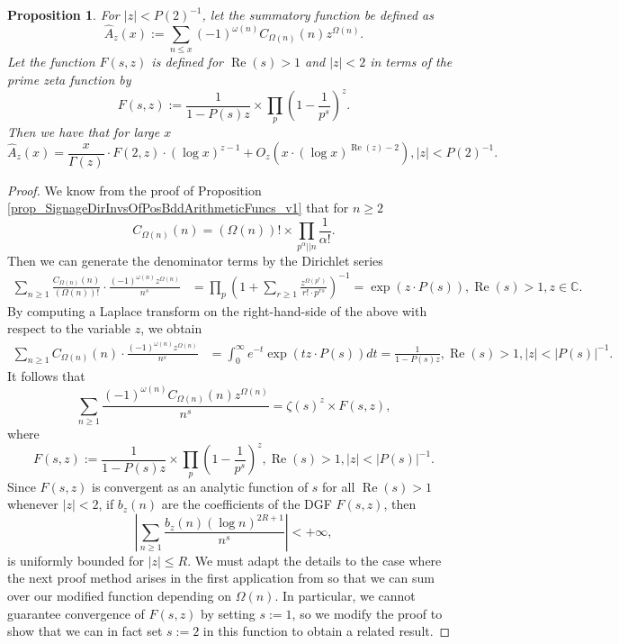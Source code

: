 \documentclass[11pt,reqno,a4letter]{article}
\numberwithin{figure}{section}
\numberwithin{table}{section}
\theoremstyle{plain}
\newtheorem{prop}[theorem]{Proposition}
\numberwithin{theorem}{section}
\theoremstyle{definition}
\renewcommand{\Re}{\operatorname{Re}}
\begin{document}
\begin{prop} 
\label{prop_HatAzx_ModSummatoryFuncExps_RelatedToCkn} 
For $|z| < P(2)^{-1}$, let the summatory function be defined as 
\[
\widehat{A}_z(x) := \sum_{n \leq x} (-1)^{\omega(n)} 
     C_{\Omega(n)}(n) z^{\Omega(n)}. 
\]
Let the function $F(s, z)$ is defined for $\Re(s) > 1$ and $|z| < 2$ 
in terms of the prime zeta function by 
\[
F(s, z) := \frac{1}{1-P(s) z} 
     \times \prod_p \left(1 - \frac{1}{p^s}\right)^{z}. 
\]
Then we have that for large $x$ 
\[
\widehat{A}_z(x) = \frac{x}{\Gamma(z)} \cdot F(2, z) \cdot (\log x)^{z-1} + 
     O_{z}\left(x \cdot (\log x)^{\Re(z) - 2}\right), |z| < P(2)^{-1}. 
\]
\end{prop} 
\begin{proof} 
We know from the proof of 
Proposition \ref{prop_SignageDirInvsOfPosBddArithmeticFuncs_v1} that for $n \geq 2$ 
\[
C_{\Omega(n)}(n) = (\Omega(n))! \times \prod_{p^{\alpha}||n} \frac{1}{\alpha!}. 
\]
Then we can generate the denominator terms by the Dirichlet series 
\begin{align*} 
\sum_{n \geq 1} \frac{C_{\Omega(n)}(n)}{(\Omega(n))!} \cdot 
     \frac{(-1)^{\omega(n)} z^{\Omega(n)}}{n^s} & = \prod_p \left(1 + \sum_{r \geq 1} 
     \frac{z^{\Omega(p^r)}}{r! \cdot p^{rs}}\right)^{-1} 
     = \exp\left(z \cdot P(s)\right), \Re(s) > 1, z \in \mathbb{C}. 
\end{align*} 
By computing a Laplace transform on the right-hand-side of the above with 
respect to the variable $z$, we obtain 
\begin{align*} 
\sum_{n \geq 1} C_{\Omega(n)}(n) \cdot \frac{(-1)^{\omega(n)} z^{\Omega(n)}}{n^s} & = 
     \int_0^{\infty} e^{-t} \exp\left(tz \cdot P(s)\right) dt = \frac{1}{1 - P(s) z}, 
     \Re(s) > 1, |z| < |P(s)|^{-1}. 
\end{align*} 
It follows that 
\[
\sum_{n \geq 1} \frac{(-1)^{\omega(n)} C_{\Omega(n)}(n) z^{\Omega(n)}}{n^s} = 
     \zeta(s)^z \times F(s, z), 
\]
where 
\[
F(s, z) := \frac{1}{1-P(s) z} \times \prod_p \left(1 - \frac{1}{p^s}\right)^{z}, 
     \Re(s) > 1, |z| < |P(s)|^{-1}. 
\]
Since $F(s, z)$ is convergent as an analytic function of $s$ for all $\Re(s) > 1$ 
whenever $|z| < 2$, 
if $b_z(n)$ are the coefficients of the DGF $F(s, z)$, then 
\[
\left\lvert \sum_{n \geq 1} \frac{b_z(n) (\log n)^{2R+1}}{n^s} \right\rvert < +\infty, 
\]
is uniformly bounded for $|z| \leq R$. 
We must adapt the details to the case where the next proof method arises in the first 
application from \cite[\S 7.4; Thm.\ 7.18]{MV} 
so that we can sum over our modified function depending on $\Omega(n)$. 
In particular, we cannot guarantee convergence of $F(s, z)$ by setting $s := 1$, 
so we modify the proof to show that we can in fact set $s := 2$ in this function 
to obtain a related result. 


\end{proof}
\end{document}
